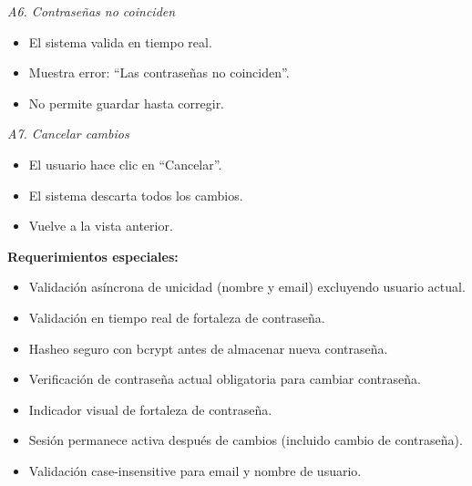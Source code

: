 \vspace{0.3em}
\noindent\textit{A6. Contraseñas no coinciden}
\begin{itemize}[nosep]
    \item El sistema valida en tiempo real.
    \item Muestra error: ``Las contraseñas no coinciden''.
    \item No permite guardar hasta corregir.
\end{itemize}

\vspace{0.3em}
\noindent\textit{A7. Cancelar cambios}
\begin{itemize}[nosep]
    \item El usuario hace clic en ``Cancelar''.
    \item El sistema descarta todos los cambios.
    \item Vuelve a la vista anterior.
\end{itemize}

\vspace{0.5em}
\noindent\textbf{Requerimientos especiales:}
\begin{itemize}[nosep]
    \item Validación asíncrona de unicidad (nombre y email) excluyendo usuario actual.
    \item Validación en tiempo real de fortaleza de contraseña.
    \item Hasheo seguro con bcrypt antes de almacenar nueva contraseña.
    \item Verificación de contraseña actual obligatoria para cambiar contraseña.
    \item Indicador visual de fortaleza de contraseña.
    \item Sesión permanece activa después de cambios (incluido cambio de contraseña).
    \item Validación case-insensitive para email y nombre de usuario.
\end{itemize}
